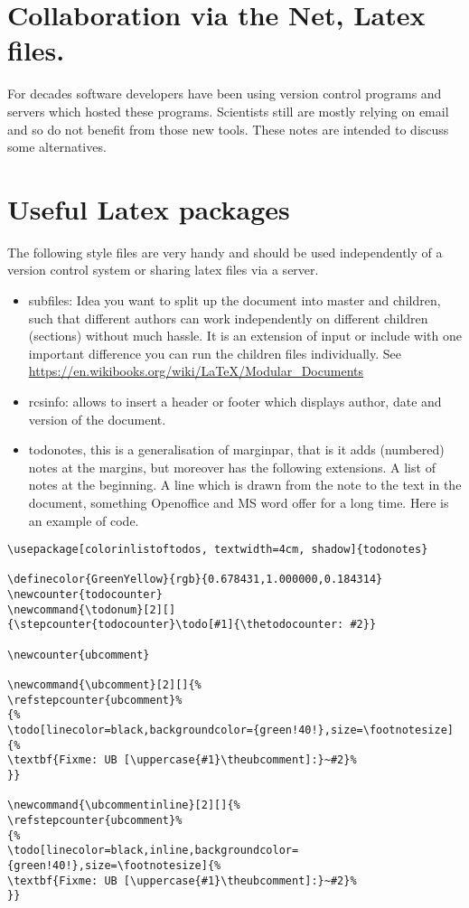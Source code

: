 \documentclass[11pt]{article}
\author{Uwe Brauer}
\date{\today}
\title{}
\begin{document}
\tableofcontents



\section{Collaboration via the Net, Latex files.}
\label{sec:orgheadline1}

For decades software developers have been using version control
programs and servers which hosted these programs. Scientists still are
mostly relying on email and so do not benefit from those new tools.
These notes are intended to discuss some alternatives.

\section{Useful Latex packages}
\label{sec:orgheadline2}


The following style files  are very handy and should be used
independently of a version control system or sharing latex files via a
server. 


\begin{itemize}
\item subfiles: Idea you want to split up the document into master
and children, such that different authors can work
independently on different children (sections) without much
hassle. It is an extension of input or include with one
important difference you can run the children files
individually. See  \url{https://en.wikibooks.org/wiki/LaTeX/Modular_Documents}

\item rcsinfo: allows to insert a header or footer which displays
author, date and version of the document.

\item todonotes, this is a generalisation of marginpar, that is it
adds (numbered) notes at the margins, but moreover has  the
following extensions. A list of notes at the beginning. A line
which is drawn from the note to the text in the document,
something Openoffice and MS word offer for a long time. Here is
an example of code.
\end{itemize}

\begin{verbatim}
\usepackage[colorinlistoftodos, textwidth=4cm, shadow]{todonotes}

\definecolor{GreenYellow}{rgb}{0.678431,1.000000,0.184314}
\newcounter{todocounter}
\newcommand{\todonum}[2][]
{\stepcounter{todocounter}\todo[#1]{\thetodocounter: #2}}

\newcounter{ubcomment}

\newcommand{\ubcomment}[2][]{%
\refstepcounter{ubcomment}%
{%
\todo[linecolor=black,backgroundcolor={green!40!},size=\footnotesize]{%
\textbf{Fixme: UB [\uppercase{#1}\theubcomment]:}~#2}%
}}

\newcommand{\ubcommentinline}[2][]{%
\refstepcounter{ubcomment}%
{%
\todo[linecolor=black,inline,backgroundcolor={green!40!},size=\footnotesize]{%
\textbf{Fixme: UB [\uppercase{#1}\theubcomment]:}~#2}%
}}
\end{verbatim}
\end{document}
